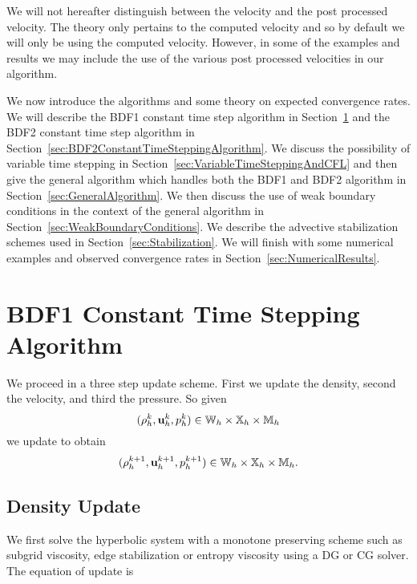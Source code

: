\documentclass[letterpaper]{erdc}
\begin{document}
\begin{remark}
We will not hereafter distinguish between the velocity and the post processed velocity.  The theory only pertains to the computed velocity and so by default we will only be using the computed velocity.  However, in some of the examples and results we may include the use of the various post processed velocities in our algorithm.
\end{remark}

We now introduce the algorithms and some theory on expected convergence rates.  We will describe the BDF1 constant time step algorithm in Section~\ref{sec:BDF1ConstantTimeSteppingAlgorithm} and the BDF2 constant time step algorithm in Section~\ref{sec:BDF2ConstantTimeSteppingAlgorithm}. We discuss the possibility of variable time stepping in Section~\ref{sec:VariableTimeSteppingAndCFL} and then give the general algorithm which handles both the BDF1 and BDF2 algorithm in Section~\ref{sec:GeneralAlgorithm}.  We then discuss the use of weak boundary conditions in the context of the general algorithm in Section~\ref{sec:WeakBoundaryConditions}.  We describe the advective stabilization schemes used in Section~\ref{sec:Stabilization}.  We will finish with some numerical examples and observed convergence rates in Section~\ref{sec:NumericalResults}.


%
%
%
\section{BDF1 Constant Time Stepping Algorithm}\label{sec:BDF1ConstantTimeSteppingAlgorithm}
We proceed in a three step update scheme.  First we update the density,  second the velocity, and third the pressure.  So given
\begin{equation}(\rho^{k}_h, \textbf{u}^{k}_{h}, p^{k}_h) \in \mathbb{W}_h\times\mathbb{X}_h\times \mathbb{M}_h  \end{equation}
we update to obtain
\begin{equation}(\rho^{k+1}_h, \textbf{u}^{k+1}_{h}, p^{k+1}_h) \in \mathbb{W}_h\times\mathbb{X}_h\times \mathbb{M}_h.\end{equation}

%
%
\subsection{Density Update}

We first solve the hyperbolic system with a monotone preserving scheme such as subgrid viscosity, edge stabilization or entropy viscosity using a DG or CG solver.  The equation of update is
\end{document}
